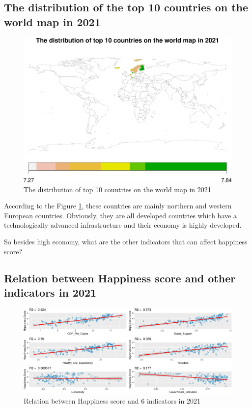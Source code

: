 \documentclass[11pt,a4paper,]{article}
\begin{document}
\hypertarget{the-distribution-of-the-top-10-countries-on-the-world-map-in-2021}{%
\subsection{The distribution of the top 10 countries on the world map in 2021}\label{the-distribution-of-the-top-10-countries-on-the-world-map-in-2021}}

\begin{figure}
\centering
\includegraphics{Assignment4_files/figure-latex/top10map-1.pdf}
\caption{\label{fig:top10map}The distribution of top 10 countries on the world map in 2021}
\end{figure}

According to the Figure \ref{fig:top10map}, these countries are mainly northern and western European countries. Obviously, they are all developed countries which have a technologically advanced infrastructure and their economy is highly developed.

So besides high economy, what are the other indicators that can affect happiness score?

\hypertarget{relation-between-happiness-score-and-other-indicators-in-2021}{%
\subsection{Relation between Happiness score and other indicators in 2021}\label{relation-between-happiness-score-and-other-indicators-in-2021}}

\begin{figure}
\centering
\includegraphics{Assignment4_files/figure-latex/relation-1.pdf}
\caption{\label{fig:relation}Relation between Happiness score and 6 indicators in 2021}
\end{figure}
\end{document}
